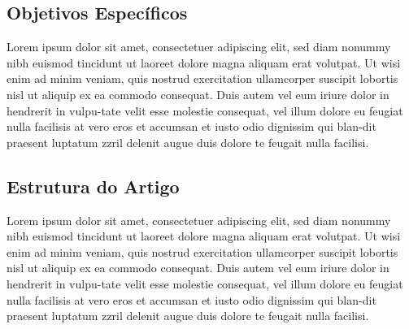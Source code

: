 \subsection{Objetivos Específicos}
\label{secao:objetivos_especificos}
Lorem ipsum dolor sit amet, consectetuer adipiscing elit, sed diam nonummy nibh euismod tincidunt ut laoreet dolore magna aliquam erat volutpat. Ut wisi enim ad minim veniam, quis nostrud exercitation ullamcorper suscipit lobortis nisl ut aliquip ex ea commodo consequat. Duis autem vel eum iriure dolor in hendrerit in vulpu-tate velit esse molestie consequat, vel illum dolore eu feugiat nulla facilisis at vero eros et accumsan et iusto odio dignissim qui blan-dit praesent luptatum zzril delenit augue duis dolore te feugait nulla facilisi.

\subsection{Estrutura do Artigo}
\label{secao:estrutura_do_artigo}
Lorem ipsum dolor sit amet, consectetuer adipiscing elit, sed diam nonummy nibh euismod tincidunt ut laoreet dolore magna aliquam erat volutpat. Ut wisi enim ad minim veniam, quis nostrud exercitation ullamcorper suscipit lobortis nisl ut aliquip ex ea commodo consequat. Duis autem vel eum iriure dolor in hendrerit in vulpu-tate velit esse molestie consequat, vel illum dolore eu feugiat nulla facilisis at vero eros et accumsan et iusto odio dignissim qui blan-dit praesent luptatum zzril delenit augue duis dolore te feugait nulla facilisi.